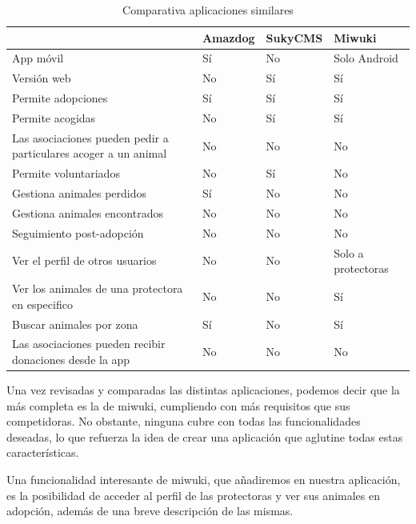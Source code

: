 \begin{table}[H] %
	\centering
	\begin{tabular}{|p{5cm}|l|l|p{2.3cm}|} \hline 
		 & \textbf{Amazdog} & \textbf{SukyCMS} & \textbf{Miwuki} \\ \hline
		App móvil & Sí & No & Solo Android \\ \hline
		Versión web & No & Sí &  Sí \\ \hline
		Permite adopciones & Sí & Sí & Sí \\ \hline
		Permite acogidas & No & Sí & Sí \\ \hline
		Las asociaciones pueden pedir a particulares acoger a un animal & No & No & No \\ \hline
		Permite voluntariados & No & Sí & No \\ \hline
		Gestiona animales perdidos & Sí & No & No \\ \hline
		Gestiona animales encontrados & No & No & No \\ \hline
		Seguimiento post-adopción & No & No & No \\ \hline
		Ver el perfil de otros usuarios & No & No & Solo a protectoras \\ \hline
		Ver los animales de una protectora en especifico & No & No & Sí \\ \hline
		Buscar animales por zona & Sí & No & Sí \\ \hline
		Las asociaciones pueden recibir donaciones desde la app & No & No & No \\ \hline
		
		
		
    \end{tabular}
		\caption{Comparativa aplicaciones similares}
		\label{tab:appsSimilares}
	\end{table}
	
	Una vez revisadas y comparadas las distintas aplicaciones, podemos decir que la más completa es la de miwuki, cumpliendo con más requisitos que sus competidoras. No obstante, ninguna cubre con todas las funcionalidades deseadas, lo que refuerza la idea de crear una aplicación que aglutine todas estas características.
	
	Una funcionalidad interesante de miwuki, que añadiremos en nuestra aplicación, es la posibilidad de acceder al perfil de las protectoras y ver sus animales en adopción, además de una breve descripción de las mismas.  